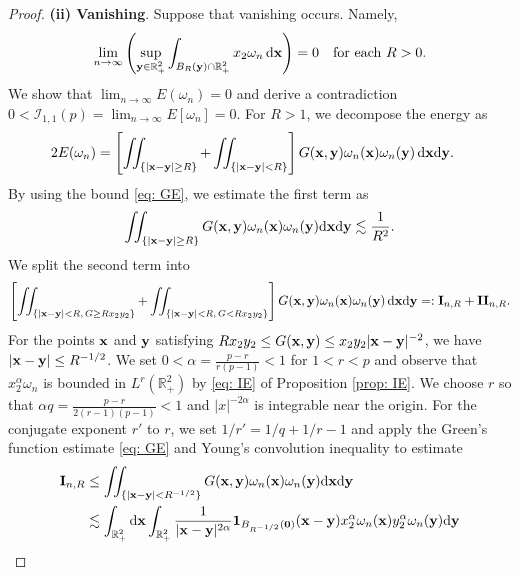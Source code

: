 \documentclass[11pt]{amsart}
\theoremstyle{definition}
\theoremstyle{definition}
\numberwithin{equation}{section}
\newcommand{\0}{\emptyset}
\newcommand{\omg}{\omega}
\newcommand{\bfx}{{\bf x}}
\newcommand{\bfy}{{\bf y}}
\newcommand{\calI}{\mathcal I}
\newcommand{\dd}{\mathrm{d}}
\begin{document}
\begin{proof}
				
				\noindent \textbf{(ii) Vanishing}. Suppose that vanishing occurs. Namely,  
				\begin{align*}
					\lim_{n\to\infty} \left( \sup_{\bfy\in \mathbb{R}^{2}_{+}}\int_{B_R(\bfy)\cap \mathbb{R}^{2}_{+}}x_2\omega_n \, \dd \bfx \right)  =   0 \quad \text{for each } R>0.
				\end{align*}
				We show that $\lim_{n\to\infty}E(\omg_n)=0$ and derive a contradiction $0<\calI_{1, 1}(p)=\lim_{n\to\infty}E[\omega_n]=0$. For $R > 1$, we decompose the energy as
				\begin{align*}
					2E(\omega_n)  & 
					= \left[ \iint_{\{|\bfx - \bfy|\geq R\}} + \iint_{\{|\bfx - \bfy|< R\}} \right] G(\bfx, \bfy)\omega_n(\bfx)\omega_n(\bfy) \, \dd \bfx\dd \bfy .
				\end{align*}
				By using the bound \eqref{eq: GE}, we estimate the first term as
				\begin{align*}
					\iint_{\{|\bfx-\bfy|\geq R\}} G(\bfx,\bfy)\omega_n(\bfx)\omega_n(\bfy)  \dd \bfx\dd \bfy \lesssim \frac{1}{ R^{2}}.
				\end{align*} 
				We split the second term into
				\begin{align*}
					\left[\iint_{\{{|\bfx - \bfy|< R, \, G\geq R x_2 y_2}\}}
					+\iint_{\{{|\bfx - \bfy|< R,\, G < R x_2 y_2}\}}\right]  G(\bfx, \bfy)\omega_n(\bfx)\omega_n(\bfy) \,  \dd \bfx\dd \bfy  =: \mathbf{I}_{n, R} + \mathbf{II}_{n, R}.
				\end{align*}
				For the points $\bfx$ and $\bfy$ satisfying $R x_2 y_2  \leq  G(\bfx, \bfy)  \leq  x_2 y_2 |\bfx - \bfy|^{-2}$,  we have $|\bfx - \bfy| \leq R^{-1/2}$. We set $0<\alpha=\frac{p-r}{r(p-1)}<1$ for $1<r<p$ and observe that $x_2^{\alpha}\omega_n$ is bounded in $L^{r}(\mathbb{R}^{2}_{+})$ by \eqref{eq: IE} of Proposition \ref{prop: IE}. We choose $r$ so that $\alpha q=\frac{p-r}{2(r-1)(p-1)}<1$ and $|x|^{-2\alpha}$ is integrable near the origin. For the conjugate exponent $r'$ to $r$, we set $1/r'=1/q+1/r-1$ and apply the Green's function estimate \eqref{eq: GE} and Young's convolution inequality to estimate
				\begin{align*}
					\mathbf{I}_{n, R}  
					&\leq  \iint_{\{|\bfx - \bfy|< R^{-1/2}\}} G(\bfx, \bfy) \omega_n(\bfx) \omega_n(\bfy)  \dd \bfx \dd \bfy \\
					&\lesssim 
					\int_{\mathbb{R}^{2}_{+}}\dd\bfx\int_{\mathbb{R}^{2}_{+}}
					\frac{1}{|\bfx-\bfy|^{2\alpha}}\mathbf{1}_{B_{R^{-1/2}}(\mathbf{0})}(\bfx-\bfy)x_2^{\alpha}\omega_n(\bfx)y_2^{\alpha}\omega_n(\bfy)\dd\bfy \\

\end{align*}
\end{proof}
\end{document}
